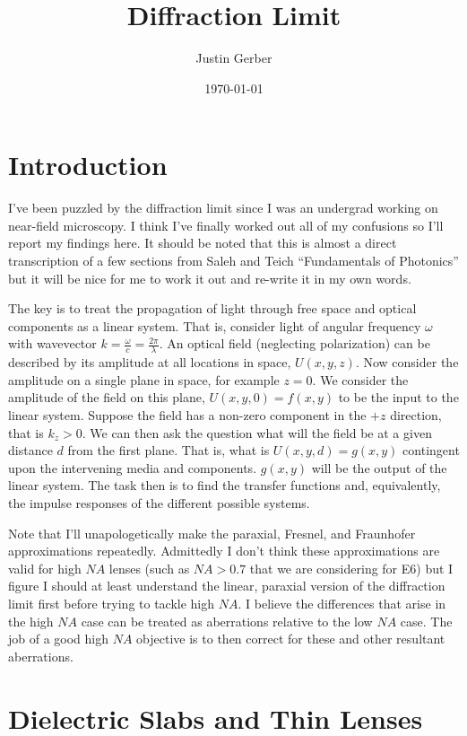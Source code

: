 \documentclass[12pt]{article}
\begin{document}
\title{Diffraction Limit}
\author{Justin Gerber}
\date{\today}
\maketitle

\section{Introduction}

I've been puzzled by the diffraction limit since I was an undergrad working on near-field microscopy. I think I've finally worked out all of my confusions so I'll report my findings here. It should be noted that this is almost a direct transcription of a few sections from Saleh and Teich ``Fundamentals of Photonics'' but it will be nice for me to work it out and re-write it in my own words.

The key is to treat the propagation of light through free space and optical components as a linear system. That is, consider light of angular frequency $\omega$ with wavevector $k = \frac{\omega}{c} = \frac{2\pi}{\lambda}$. An optical field (neglecting polarization) can be described by its amplitude at all locations in space, $U(x,y,z)$. Now consider the amplitude on a single plane in space, for example $z=0$. We consider the amplitude of the field on this plane, $U(x,y,0) = f(x,y)$ to be the input to the linear system. Suppose the field has a non-zero component in the $+z$ direction, that is $k_z > 0$. We can then ask the question what will the field be at a given distance $d$ from the first plane. That is, what is $U(x,y,d) = g(x,y)$ contingent upon the intervening media and components. $g(x,y)$ will be the output of the linear system. The task then is to find the transfer functions and, equivalently, the impulse responses of the different possible systems.

Note that I'll unapologetically make the paraxial, Fresnel, and Fraunhofer approximations repeatedly. Admittedly I don't think these approximations are valid for high $NA$ lenses (such as $NA > 0.7$ that we are considering for E6) but I figure I should at least understand the linear, paraxial version of the diffraction limit first before trying to tackle high $NA$. I believe the differences that arise in the high $NA$ case can be treated as aberrations relative to the low $NA$ case. The job of a good high $NA$ objective is to then correct for these and other resultant aberrations. 

\section{Dielectric Slabs and Thin Lenses}
\end{document}
